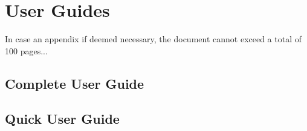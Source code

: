 \chapter{User Guides}
\label{apendix:userguide}

In case an appendix if deemed necessary, the document cannot exceed a total of 100 pages...

\section{Complete User Guide}



\section{Quick User Guide}

